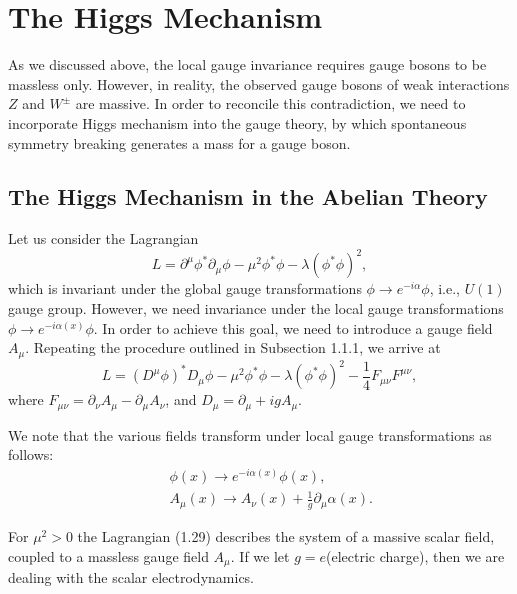 \section{The Higgs Mechanism}
As we discussed above, the local gauge invariance requires gauge bosons to be massless only. However, in reality, the observed gauge bosons of weak interactions $Z$ and $W^{\pm}$ are massive. In order to reconcile this contradiction, we need to incorporate Higgs mechanism\cite{Higgs1,Higgs2,Higgs3} into the gauge theory, by which spontaneous symmetry breaking generates a mass for a gauge boson. 

\subsection{The Higgs Mechanism in the Abelian Theory}
Let us consider the Lagrangian 
\begin{equation}
L=\partial^\mu \phi^{\ast}\partial_\mu\phi-\mu^2\phi^{\ast}\phi-\lambda(\phi^{\ast}\phi)^2,
\end{equation}
which is invariant under the global gauge transformations $\phi\to e^{-i\alpha}\phi$, i.e., $U(1)$ gauge group. However, we need invariance under the local gauge transformations $\phi\to e^{-i\alpha(x)}\phi$. In order to achieve this goal, we need to introduce a gauge field $A_\mu$. Repeating the procedure outlined in Subsection 1.1.1, we arrive at 
\begin{equation}
L=(D^\mu \phi)^{\ast}D_\mu\phi-\mu^2\phi^{\ast}\phi-\lambda(\phi^{\ast}\phi)^2-\frac{1}{4}F_{\mu\nu}F^{\mu\nu},
\end{equation}
where $F_{\mu\nu}=\partial_\nu A_\mu - \partial_\mu A_\nu$, and $D_\mu=\partial_\mu+igA_\mu$.

We note that the various fields transform under local gauge transformations as follows:
\begin{eqnarray}
&&\phi(x)\to e^{-i\alpha(x)}\phi(x),\nonumber\\
&&A_\mu (x)\to A_\nu (x)+\frac{1}{g}\partial_\mu\alpha(x).
\end{eqnarray}

For $\mu^2>0$ the Lagrangian (1.29) describes the system of a massive scalar field, coupled to a massless gauge field $A_\mu$. If we let $g=e$(electric charge), then we are dealing with the scalar electrodynamics.  

